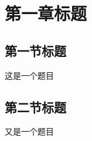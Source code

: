 \documentclass[withinsec]{mathexercise}
\begin{document}
\chapter{第一章标题}



\section{第一节标题}
\begin{exercise}[2]
    这是一个题目
\end{exercise}


\section{第二节标题}

\begin{exercise}
    又是一个题目
\end{exercise}
\end{document}
